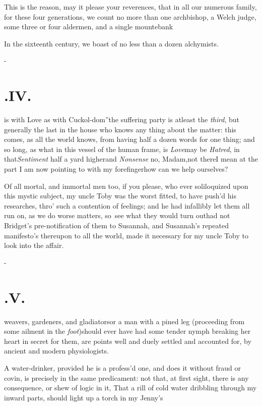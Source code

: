 \documentclass{article}
\begin{document}
This is the reason, may it please your reverences, that in all
our numerous fa\-mily, for these four generations, we count no more
than one archbishop, a Welch judge, some three or four
aldermen, and a single mountebank\tsh

In the sixteenth century, we boast of no less than a dozen
alchymists.

\vfill{}\eject
\null\kern-\baselineskip
\section{.\enspace IV.}

 is with Love as with
Cuckol-\break dom”\tsh the suffering party is at\break least the
\textit{third}, but generally the last in the house who knows any
thing about the matter: this comes, as all the world knows, from
having half a dozen words for one thing; and so long, as what in
this vessel of the human frame, is \textit{Love}\tsk may be
\textit{Hatred}, in that\tsh \textit{Sentiment}\break
half a yard higher\tsh and \textit{Nonsense}\tsh\break
\tsh\!\tsk no, Madam,\tsk not there\tsk I\break
mean at the part I am now
pointing to with my forefinger\tsh how can we help\break
ourselves?

Of all mortal, and immortal men too, if you please, who ever soliloquized upon this
mystic subject, my uncle Toby was the worst fitted, to have push’d his researches,
thro’ such a contention of feelings; and he had infallibly let them all run on, as
we do worse matters, so\sic\ see what they would turn out\tsh had not Bridget’s
pre-notification of them to\break
Susannah, and Susannah’s repeated manifesto’s thereupon
to all the world, made it necessary for my uncle Toby to look into the affair.

\vfill{}\eject
\null\kern-\baselineskip
\section{.\enspace V.}

 weavers, gardeners, and
gla\-diators\tsk or a man with a pined leg (proceeding from some
ailment in\break
the \textit{foot})\tsk should ever have had some tender
nymph breaking her heart in secret for them, are points well and
duely settled and accounted for, by ancient and modern
physiologists.

A water-drinker, provided he is a profess’d one, and does
it without fraud or covin, is precisely in the same predicament:
not that, at first sight, there is any consequence, or shew of
logic in it,\break
\lqq That a rill of cold water dribbling\break
\lqq through my inward parts, should light\break
\lqq up a torch in my Jenny’s\tsk{}
\end{document}

